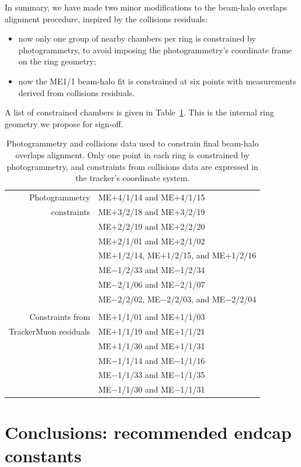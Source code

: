 \documentclass[12pt]{article}
\begin{document}
In summary, we have made two minor modifications to the beam-halo
overlaps alignment procedure, inspired by the collisions residuals:
\begin{itemize}
\item now only one group of nearby chambers per ring is constrained by
  photogrammetry, to avoid imposing the photogrammetry's coordinate
  frame on the ring geometry;
\item now the ME1/1 beam-halo fit is constrained at six points with
  measurements derived from collisions residuals.
\end{itemize}
A list of constrained chambers is given in Table~\ref{tab:pgholes}.
This is the internal ring geometry we propose for sign-off.

\begin{table}
\caption{Photogrammetry and collisions data used to constrain final
  beam-halo overlaps alignment.  Only one point in each ring is
  constrained by photogrammetry, and constraints from collisions data
  are expressed in the tracker's coordinate system. \label{tab:pgholes}}
\begin{center}
\begin{tabular}{r l}
Photogrammetry & ME$+$4/1/14 and ME$+$4/1/15 \\
constraints & ME$+$3/2/18 and ME$+$3/2/19 \\
& ME$+$2/2/19 and ME$+$2/2/20 \\
& ME$+$2/1/01 and ME$+$2/1/02 \\
& ME$+$1/2/14, ME$+$1/2/15, and ME$+$1/2/16 \\
& ME$-$1/2/33 and ME$-$1/2/34 \\
& ME$-$2/1/06 and ME$-$2/1/07 \\
& ME$-$2/2/02, ME$-$2/2/03, and ME$-$2/2/04 \\
& \\
Constraints from & ME$+$1/1/01 and ME$+$1/1/03 \\
TrackerMuon residuals & ME$+$1/1/19 and ME$+$1/1/21 \\
& ME$+$1/1/30 and ME$+$1/1/31 \\
& ME$-$1/1/14 and ME$-$1/1/16 \\
& ME$-$1/1/33 and ME$-$1/1/35 \\
& ME$-$1/1/30 and ME$-$1/1/31 \\
\end{tabular}
\end{center}
\end{table}

\section{Conclusions: recommended endcap constants}
\end{document}
